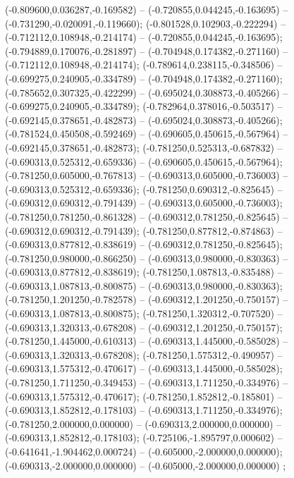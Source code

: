  (-0.809600,0.036287,-0.169582) -- (-0.720855,0.044245,-0.163695) -- (-0.731290,-0.020091,-0.119660);
 (-0.801528,0.102903,-0.222294) -- (-0.712112,0.108948,-0.214174) -- (-0.720855,0.044245,-0.163695);
 (-0.794889,0.170076,-0.281897) -- (-0.704948,0.174382,-0.271160) -- (-0.712112,0.108948,-0.214174);
 (-0.789614,0.238115,-0.348506) -- (-0.699275,0.240905,-0.334789) -- (-0.704948,0.174382,-0.271160);
 (-0.785652,0.307325,-0.422299) -- (-0.695024,0.308873,-0.405266) -- (-0.699275,0.240905,-0.334789);
 (-0.782964,0.378016,-0.503517) -- (-0.692145,0.378651,-0.482873) -- (-0.695024,0.308873,-0.405266);
 (-0.781524,0.450508,-0.592469) -- (-0.690605,0.450615,-0.567964) -- (-0.692145,0.378651,-0.482873);
 (-0.781250,0.525313,-0.687832) -- (-0.690313,0.525312,-0.659336) -- (-0.690605,0.450615,-0.567964);
 (-0.781250,0.605000,-0.767813) -- (-0.690313,0.605000,-0.736003) -- (-0.690313,0.525312,-0.659336);
 (-0.781250,0.690312,-0.825645) -- (-0.690312,0.690312,-0.791439) -- (-0.690313,0.605000,-0.736003);
 (-0.781250,0.781250,-0.861328) -- (-0.690312,0.781250,-0.825645) -- (-0.690312,0.690312,-0.791439);
 (-0.781250,0.877812,-0.874863) -- (-0.690313,0.877812,-0.838619) -- (-0.690312,0.781250,-0.825645);
 (-0.781250,0.980000,-0.866250) -- (-0.690313,0.980000,-0.830363) -- (-0.690313,0.877812,-0.838619);
 (-0.781250,1.087813,-0.835488) -- (-0.690313,1.087813,-0.800875) -- (-0.690313,0.980000,-0.830363);
 (-0.781250,1.201250,-0.782578) -- (-0.690312,1.201250,-0.750157) -- (-0.690313,1.087813,-0.800875);
 (-0.781250,1.320312,-0.707520) -- (-0.690313,1.320313,-0.678208) -- (-0.690312,1.201250,-0.750157);
 (-0.781250,1.445000,-0.610313) -- (-0.690313,1.445000,-0.585028) -- (-0.690313,1.320313,-0.678208);
 (-0.781250,1.575312,-0.490957) -- (-0.690313,1.575312,-0.470617) -- (-0.690313,1.445000,-0.585028);
 (-0.781250,1.711250,-0.349453) -- (-0.690313,1.711250,-0.334976) -- (-0.690313,1.575312,-0.470617);
 (-0.781250,1.852812,-0.185801) -- (-0.690313,1.852812,-0.178103) -- (-0.690313,1.711250,-0.334976);
 (-0.781250,2.000000,0.000000) -- (-0.690313,2.000000,0.000000) -- (-0.690313,1.852812,-0.178103);
 (-0.725106,-1.895797,0.000602) -- (-0.641641,-1.904462,0.000724) -- (-0.605000,-2.000000,0.000000);
 (-0.690313,-2.000000,0.000000) -- (-0.605000,-2.000000,0.000000) ;

